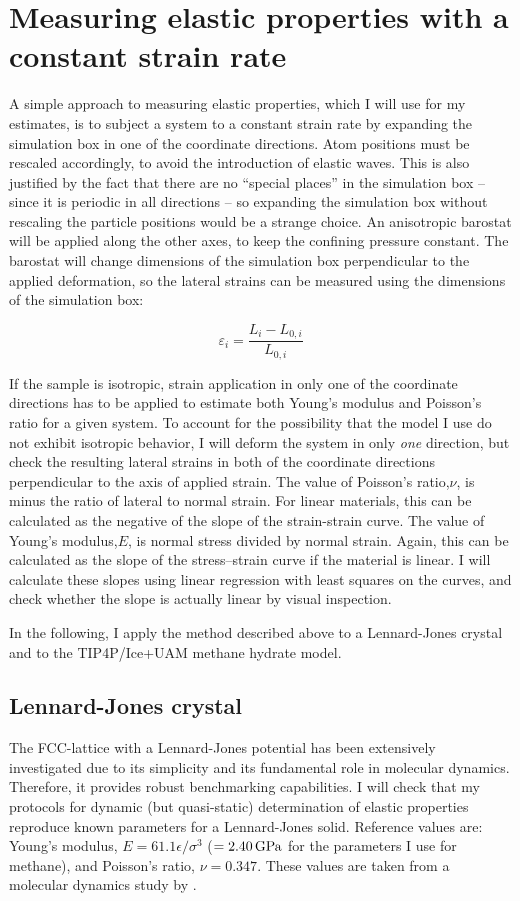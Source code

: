 \section{Measuring elastic properties with a constant strain rate}
A simple approach to measuring elastic properties, which I will use for my estimates, is to subject a system to a constant strain rate by expanding the simulation box in one of the coordinate directions. Atom positions must be rescaled accordingly, to avoid the introduction of elastic waves. This is also justified by the fact that there are no ``special places'' in the simulation box -- since it is periodic in all directions -- so expanding the simulation box without rescaling the particle positions would be a strange choice. An anisotropic barostat will be applied along the other axes, to keep the confining pressure constant. The barostat will change dimensions of the simulation box perpendicular to the applied deformation, so the lateral strains can be measured using the dimensions of the simulation box:

\begin{equation}
\varepsilon_i = \frac{L_i-L_{0, i}}{L_{0, i}}
\end{equation}

If the sample is isotropic, strain application in only one of the coordinate directions has to be applied to estimate both Young's modulus and Poisson's ratio for a given system. To account for the possibility that the model I use do not exhibit isotropic behavior, I will deform the system in only \emph{one} direction, but check the resulting lateral strains in both of the coordinate directions perpendicular to the axis of applied strain. The value of Poisson's ratio,$\nu$, is minus the ratio of lateral to normal strain. For linear materials, this can be calculated as the negative of the slope of the strain-strain curve. The value of Young's modulus,$E$, is normal stress divided by normal strain. Again, this can be calculated as the slope of the stress--strain curve if the material is linear. I will calculate these slopes using linear regression with least squares on the curves, and check whether the slope is actually linear by visual inspection.

In the following, I apply the method described above to a Lennard-Jones crystal and to the TIP4P/Ice+UAM methane hydrate model.

\subsection{Lennard-Jones crystal}
The FCC-lattice with a Lennard-Jones potential has been extensively investigated due to its simplicity and its fundamental role in molecular dynamics. Therefore, it provides robust benchmarking capabilities. I will check that my protocols for dynamic (but quasi-static) determination of elastic properties reproduce known parameters for a Lennard-Jones solid. Reference values are: Young's modulus, $E=61.1 \epsilon/\sigma^3$ ($ = \text{\SI{2.40}{\giga\pascal}}$ for the parameters I use for methane), and Poisson's ratio, $\nu=0.347$. These values are taken from a molecular dynamics study by \citet{Quesnel1993}.

